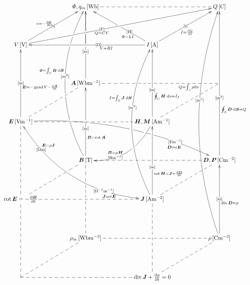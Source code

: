 \documentclass[a4j,10pt]{jarticle}
\makeatletter
\def\uni#1{[\!\unit{#1}]}
\def\cell#1#2{#1\,\uni{#2}}
\def\dottedhole#1{\ar@{--}[#1]|!{[ld];[lu]}\hole}
\def\dottedholea#1{\ar@{--}[#1]|!{[ld];[lu]}\hole |!{+(-9.5,-10);+(-9.5,10)}\hole }
\def\dotted#1{\ar@{--}[#1]}
\def\dotteda#1{\ar@{--}[#1] |!{+(11.5,-50);+(11.5,50)}\hole}
\def\arr#1#2#3#4#5{\ar[#1] |-(#2){\uni{#3}} _(#4){#5}}
\def\arruu#1#2#3#4{\arr{uu}{#1}{#2}{#3}{#4}}
\def\arruubefore#1{\arruu{0.4}{m}{0.33}{#1}}
\def\arruubeforemiddlehole{\arruubefore{}|-(0.5)\hole}
\def\arruumiddle#1{\arruu{0.5}{m}{0.45}{#1}}
\def\arrbeforeafter#1#2#3{\arr{#1}{0.4}{#2}{0.40}{#3}}
\def\arrmiddle#1#2#3{\arr{#1}{0.5}{#2}{0.45}{#3}}
\def\arruuuu#1#2#3#4{\arr{uuuu}{#1}{#2}{#3}{#4}}
\def\arruuuubefore#1{\arruuuu{0.4}{m^2}{0.33}{#1}}
\def\arrup#1#2#3#4#5{\ar[#1] |-(#2){\uni{#3}}^(#4){#5}}
\def\arrupbeforebeforebefore#1#2#3{\arrup{#1}{0.3}{#2}{0.3}{#3}}
\def\arrupmiddle#1#2#3{\arrup{#1}{0.5}{#2}{0.45}{#3}}
\def\arrupbeforebefore#1#2#3{\arrup{#1}{0.4}{#2}{0.35}{#3}}
\def\arrcv#1#2#3#4#5{\ar@/^3pc/[#1]|-(#2){\uni{#3}}^(#4){#5}}
\def\arrcvafter#1#2#3{\arrcv{#1}{0.6}{#2}{0.65}{#3}}
\def\arrowyyy#1#2#3{\ar@/^3pc/[#1] |-(0.24)\hole |-(0.25){} |-(0.42)\hole|-(.55){\uni{#2}}^(.58){#3}|!{[luuu];[uuur]}\hole  |-(.768)\hole |-(.78){} |-(.836)\hole}
\def\arrowyy#1#2#3#4#5{\ar@/_3pc/@{<->}[#1]|-(0.2){\uni{#4}}^(0.2){#5}|-(.75){\uni{#2}}_(.75){#3}}
\def\arrowz#1#2#3{\ar@/^2pc/[#1] |!{+(-10,-10);+(-10,10)}\hole|-(.7){\uni{#2}}_(.6){#3}}
\def\arrowzz#1#2#3{\ar@/^2pc/[#1] |-(.2)\hole|-(.3)\hole |-(.545)\hole |-(.625)\hole |-(.64){} |!{[rr];[rrdd]}\hole |-(.8){\uni{#2}}_(.8){#3\quad}}
\newcommand{\A}{\bm A}
\newcommand{\B}{\bm B}
\newcommand{\D}{\bm D}
\newcommand{\E}{\bm E}
\newcommand{\J}{\bm J}
\newcommand{\M}{\bm M}
\newcommand{\bmP}{\bm P}
\makeatother
\begin{document}
\begin{center}
\[\xymatrix@=0.70in{
  & \cell{\varPhi, q_m}{Wb}\dotted{rr}\ar@{-}[d]|!{[ld];[rr]}\hole & & \cell{Q}{C}\\
  \cell V V\arrupmiddle{ur}{s}{e=-\fracpd\varPhi t}\arrbeforeafter{rrru}{F}{Q=CV} & & \cell I A\arrupbeforebefore{ll}{O}{V=RI}\arrmiddle{ur}{s}{I=\diff Q t}\arrupbeforebeforebefore{lu}{H}{\varPhi=LI}|-(0.5)\hole & \\
  & \cell{\A}{Wbm^{-1}} \arruubeforemiddlehole|!{[lu];[ruru]}\hole & *=0{} & \dottedholea{ll}\dotted{ld}\\
  \cell{\E}{Vm^{-1}}\arruumiddle{\E=-\grad V-\frac{\partial\A}{\partial t}}\dotted{rr} |!{+(20,-10);+(20,10)}\hole |!{+(32.5,-10);+(32.5,10)}\hole \dotted{ru}\arrowzz{rrrd}{Fm^{-1}}{\D=\varepsilon\E}\arrowyy{rrdd}{O^{-1}m^{-1}}{\J=\sigma\E}{Om}{\E=\rho\J } & & \cell{\bm H,\M}{Am^{-1}}\arruubefore{\oint_C\bm H\cdot\dd s=I_f}\arrowz{dl}{Hm^{-1}}{\B=\mu\bm H} & \\
  & \cell{\B}{T}\arruubeforemiddlehole_(.3){\B=\rot \A} \arrowyyy{uuuu}{m^2}{\varPhi=\int_S\B\cdot\dd\bm S} & & \cell{\D,\bmP}{Cm^{-2}}\arruuuubefore{\oint_S\D\cdot\dd\bm{S}=Q}\dottedhole{ll}\dotted{ld}\\
  {\rot\E=-\frac{\partial\B}{\partial t}}\dotted{uu}\dotted{rr}\dotteda{ru} & & \cell{\J}{Am^{-2}}\arruubefore{\rot\bm H=\J +\frac{\partial\D}{\partial t}}\arrcvafter{uuuu}{m^2}{I=\int_S\J\cdot\dd\bm S}\\
  & \cell{\rho_m}{Wbm^{-3}}\ar@{--}[uu]|!{[u];[u]}\hole |-(.73)\hole & & \cell{\rho}{Cm^{-3}}\arruumiddle{\diver\D=\rho}\arrcvafter{uuuuuu}{m^3}{Q=\int_v\rho\dd v}\dottedhole{ll}\dotted{ld}\\
  *=0{} \dotted{uu}\dotted{rr}\dotted{ru} & & \diver\J +\frac{\partial\rho}{\partial t}=0\dotted{uu} |!{+(-10,-10);(10,-10)}\hole & \\
}\]


\end{center}
\end{document}
